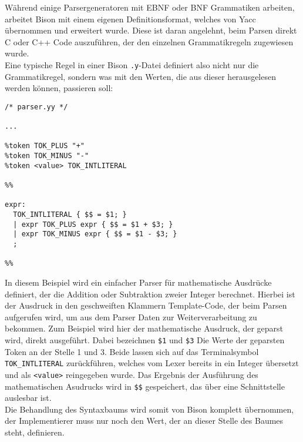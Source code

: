 Während einige Parsergeneratoren mit EBNF oder BNF Grammatiken arbeiten, arbeitet Bison mit einem eigenen Definitionsformat, welches von Yacc übernommen und erweitert wurde.
Diese ist daran angelehnt, beim Parsen direkt C oder C++ Code auszuführen, der den einzelnen Grammatikregeln zugewiesen wurde.\\
Eine typische Regel in einer Bison \texttt{.y}-Datei definiert also nicht nur die Grammatikregel, sondern was mit den Werten, die aus dieser herausgelesen werden können, passieren soll:

\begin{lstlisting}[caption={Bison Beispiel}]
/* parser.yy */

...

%token TOK_PLUS "+"
%token TOK_MINUS "-"
%token <value> TOK_INTLITERAL

%%

expr:
  TOK_INTLITERAL { $$ = $1; }
  | expr TOK_PLUS expr { $$ = $1 + $3; }
  | expr TOK_MINUS expr { $$ = $1 - $3; }
  ;

%%
\end{lstlisting}

In diesem Beispiel wird ein einfacher Parser für mathematische Ausdrücke definiert, der die Addition oder Subtraktion zweier Integer berechnet.
Hierbei ist der Ausdruck in den geschweiften Klammern Template-Code, der beim Parsen aufgerufen wird, um aus dem Parser Daten zur Weiterverarbeitung zu bekommen.
Zum Beispiel wird hier der mathematische Ausdruck, der geparst wird, direkt ausgeführt.
Dabei bezeichnen \texttt{\$1} und \texttt{\$3} Die Werte der geparsten Token an der Stelle 1 und 3.
Beide lassen sich auf das Terminalsymbol \texttt{TOK\_INTLITERAL} zurückführen, welches vom Lexer bereits in ein Integer übersetzt und als \texttt{<value>} reingegeben wurde. 
Das Ergebnis der Ausführung des mathematischen Asudrucks wird in \texttt{\$\$} gespeichert, das über eine Schnittstelle auslesbar ist.\\
Die Behandlung des Syntaxbaums wird somit von Bison komplett übernommen, der Implementierer muss nur noch den Wert, der an dieser Stelle des Baumes steht, definieren.

